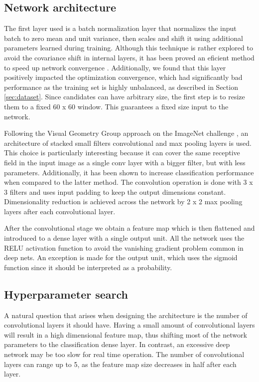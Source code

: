     \subsection{Network architecture}
        The first layer used is a batch normalization layer \cite{DBLP:journals/corr/IoffeS15} that normalizes the input batch to zero mean and unit variance, then scales and shift it using additional parameters learned during training. Although this technique is rather explored to avoid the covariance shift in internal layers, it has been proved an eficient method to speed up network convergence \cite{DBLP:journals/corr/IoffeS15}. Additionally, we found that this layer positively impacted the optimization convergence, which had significantly bad performance as the training set is highly unbalanced, as described in Section \ref{sec:dataset}. Since candidates can have arbitrary size, the first step is to resize them to a fixed 60 x 60 window. This guarantees a fixed size input to the network.

        Following the Visual Geometry Group approach on the ImageNet challenge \cite{Simonyan14c}, an architecture of stacked small filters convolutional and max pooling layers is used. This choice is particularly interesting because it can cover the same receptive field in the input image as a single conv layer with a bigger filter, but with less parameters. Additionally, it has been shown \cite{Simonyan14c} to increase classification performance when compared to the latter method. The convolution operation is done with 3 x 3 filters and uses input padding to keep the output dimensions constant. Dimensionality reduction is achieved across the network by 2 x 2 max pooling layers after each convolutional layer.

        After the convolutional stage we obtain a feature map which is then flattened and introduced to a dense layer with a single output unit. All the network uses the RELU \cite{nair2010relu} activation function to avoid the vanishing gradient problem common in deep nets. An exception is made for the output unit, which uses the sigmoid function since it should be interpreted as a probability.

    \subsection{Hyperparameter search}
        A natural question that arises when designing the architecture is the number of convolutional layers it should have. Having a small amount of convolutional layers will result in a high dimensional feature map, thus shifting most of the network parameters to the classification dense layer. In contrast, an excessive deep network may be too slow for real time operation. The number of convolutional layers can range up to 5, as the feature map size decreases in half after each layer.

